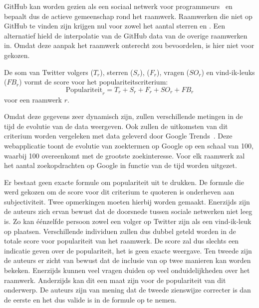 GitHub kan worden gezien als een sociaal netwerk voor programmeurs~\cite{Catone2008} en bepaalt dus de actieve gemeenschap rond het raamwerk.
Raamwerken die niet op GitHub te vinden zijn krijgen nul voor zowel het aantal sterren en .
Een alternatief hield de interpolatie van de GitHub data van de overige raamwerken in.
Omdat deze aanpak het raamwerk onterecht zou bevoordelen, is hier niet voor gekozen.

De som van Twitter volgers ($T_r$), \gh{} sterren ($S_r$), \gh{}  ($F_r$), \so{} vragen ($SO_r$) en \fb{} vind-ik-leuks ($FB_r$) vormt de score voor het populariteitscriterium:
\begin{equation}
  \text{Populariteit}_r=T_r+S_r+F_r+SO_r+FB_r
  \label{eq:populariteit}
\end{equation}
voor een raamwerk $r$.

Omdat deze gegevens zeer dynamisch zijn, zullen verschillende metingen in de tijd de evolutie van de data weergeven.
Ook zullen de uitkomsten van dit criterium worden vergeleken met data geleverd door Google Trends~\cite{Google2012a}.
Deze webapplicatie toont de evolutie van zoektermen op Google op een schaal van 100, waarbij 100 overeenkomt met de grootste zoekinteresse.
Voor elk raamwerk zal het aantal zoekopdrachten op Google in functie van de tijd worden uitgezet.

Er bestaat geen exacte formule om populariteit uit te drukken.
De formule die werd gekozen om de score voor dit criterium te quoteren is onderheven aan subjectiviteit.
Twee opmerkingen moeten hierbij worden gemaakt.
Enerzijds zijn de auteurs zich ervan bewust dat de doorsnede tussen sociale netwerken niet leeg is.
Zo kan éénzelfde persoon zowel een volger op Twitter zijn als een vind-ik-leuk op \fb{} plaatsen.
Verschillende individuen zullen dus dubbel geteld worden in de totale score voor populariteit van het raamwerk.
De score zal dus slechts een indicatie geven over de populariteit,  het is geen exacte weergave.
Ten tweede zijn de auteurs er zicht van bewust dat de inclusie van \so{} op twee manieren kan worden bekeken.
Enerzijds kunnen veel vragen duiden op veel onduidelijkheden over het raamwerk.
Anderzijds kan dit een maat zijn voor de populariteit van dit onderwerp.
De auteurs zijn van mening dat de tweede zienswijze correcter is dan de eerste en het dus valide is \so{} in de formule op te nemen.



